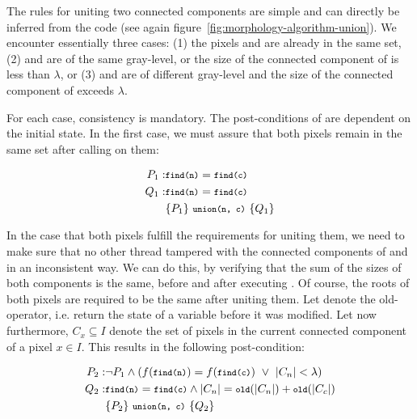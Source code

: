 The rules for uniting two connected components are simple and can directly be
inferred from the code (see again
figure~\ref{fig:morphology-algorithm-union}). We encounter essentially three
cases: (1) the pixels  and  are already in the same
set, (2)  and  are of the same
gray-level, or the size of the connected component of  is less
than $\lambda$, or (3)  and  are of
different gray-level and the size of the connected component of 
exceeds $\lambda$.

For each case, consistency is mandatory. The post-conditions of
 are dependent on the initial state. In the first case, we must assure that both pixels remain
in the same set after calling  on them:

\begin{eqnarray}
  P_1: & {\footnotesize\texttt{find(n)}} = {\footnotesize\texttt{find(c)}} \\
  Q_1: & {\footnotesize\texttt{find(n)}} = {\footnotesize\texttt{find(c)}} \\
  & \{P_1\} ~ {\footnotesize\texttt{union(n, c)}} ~ \{Q_1\}
  \label{eq:correctness-area-opening-properties-uf-1}
\end{eqnarray}

In the case that both pixels fulfill the requirements for uniting them, we need
to make sure that no other thread tampered with the connected components of
 and  in an inconsistent way. We can do this, by
verifying that the sum of the sizes of both components is the same, before and
after executing . Of course, the roots of both pixels are
required to be the same after uniting them. Let  denote the
old-operator, i.e. return the state of a variable before it was modified. Let
now furthermore, $C_x \subseteq I$ denote the set of pixels in the current
connected component of a pixel $x \in I$. This results in the following
post-condition:

\begin{eqnarray}
  P_2: & \neg P_1 \wedge ( f({\footnotesize\texttt{find(n)}}) = f({\footnotesize\texttt{find(c)}}) ~ \vee ~ |C_n| < \lambda) \\
  Q_2: & {\footnotesize\texttt{find(n)}} = {\footnotesize\texttt{find(c)}} \wedge |C_n| = {\footnotesize\texttt{old}}(|C_n|) + {\footnotesize\texttt{old}}(|C_c|) \\
  & \{P_2\} ~ {\footnotesize\texttt{union(n, c)}} ~ \{Q_2\}
  \label{eq:correctness-area-opening-properties-uf-2}
\end{eqnarray}

